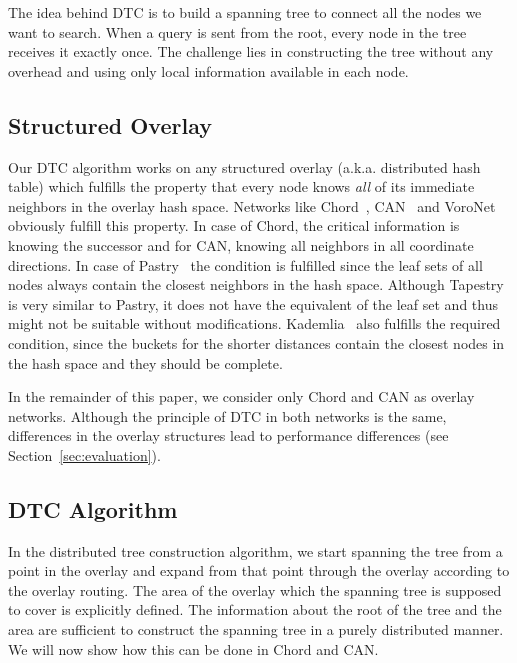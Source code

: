 \documentclass[fleqn,12pt,twoside]{article}
\begin{document}
The idea behind DTC is to build a spanning tree to connect all the
nodes we want to search. When a query is sent from the root, every
node in the tree receives it exactly once. The challenge lies in
constructing the tree without any overhead and using only local information
available in each node.


\subsection{Structured Overlay}
\label{sec:structured-overlay}

Our DTC algorithm works on any structured overlay (a.k.a. distributed
hash table) which fulfills the property that every node knows
\emph{all} of its immediate neighbors in the overlay hash space.
Networks like Chord~\cite{StoicaI:Chord}, CAN~\cite{RatnasamyS:CAN} and VoroNet~\cite{beaumont2007vso}
obviously fulfill this property. In case of Chord, the critical
information is knowing the successor and for CAN, knowing all
neighbors in all coordinate directions. In case of
Pastry~\cite{RowstronA:Pastry} the condition is fulfilled since the
leaf sets of all nodes always contain the closest neighbors in the
hash space.  Although Tapestry~\cite{ZhaoB:TapestryJ} is very similar
to Pastry, it does not have the equivalent of the leaf set and thus
might not be suitable without modifications.
Kademlia~\cite{MaymounkovP:Kademlia} also fulfills the required
condition, since the buckets for the shorter distances contain the
closest nodes in the hash space and they should be complete.

In the remainder of this paper, we consider only Chord and CAN as
overlay networks. Although the principle of DTC in both networks is
the same, differences in the overlay structures lead to
performance differences (see Section~\ref{sec:evaluation}).

\subsection{DTC Algorithm}
\label{sec:dtc-algorithm}

In the distributed tree construction algorithm, we start spanning the
tree from a point in the overlay and expand from that point through
the overlay according to the overlay routing. The area of the overlay
which the spanning tree is supposed to cover is explicitly defined.
The information about the root of the tree and the area are sufficient
to construct the spanning tree in a purely distributed manner. We will
now show how this can be done in Chord and CAN.
\end{document}
